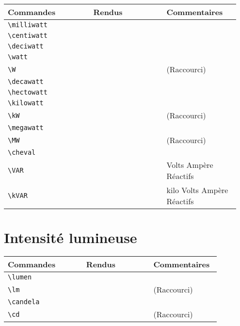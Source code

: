 \documentclass[a4paper,12pt]{article}
\newcommand{\rac}{({\color{red}Raccourci})}
\begin{document}
	\noindent
	\begin{tabular}{|p{0.35\linewidth}|p{0.3\linewidth}|p{0.3\linewidth}|}
		\hline
 			\textbf{Commandes}&\textbf{Rendus}&\textbf{Commentaires}
 		\\\hline\hline
			\verb!\milliwatt!	& 	\milliwatt	&	\\
		\hline
			\verb!\centiwatt!	& 	\centiwatt	&	\\
		\hline
			\verb!\deciwatt!	& 	\deciwatt	&	\\
		\hline
			\verb!\watt!		& 	\watt		&	\\
		\hline
			\verb!\W!		& 	\W		&	\rac\\
		\hline
			\verb!\decawatt!	& 	\decawatt	&	\\
		\hline
			\verb!\hectowatt!	& 	\hectowatt	&	\\
		\hline
			\verb!\kilowatt!	& 	\kilowatt	&	\\
		\hline
			\verb!\kW!		& 	\kW		&	\rac\\
		\hline
			\verb!\megawatt!	& 	\megawatt	&	\\
		\hline
			\verb!\MW!		& 	\MW		&	\rac\\
		\hline
			\verb!\cheval!		& 	\cheval		&	\\
		\hline
			\verb!\VAR!		& 	\VAR		&	Volts Ampère Réactifs\\
		\hline
			\verb!\kVAR!		& 	\kVAR		&	kilo Volts Ampère Réactifs\\
		\hline
	\end{tabular}
	
	
	\section{Intensité lumineuse}

	\noindent
	\begin{tabular}{|p{0.35\linewidth}|p{0.3\linewidth}|p{0.3\linewidth}|}
		\hline
 			\textbf{Commandes}&\textbf{Rendus}&\textbf{Commentaires}
 		\\\hline\hline
			\verb!\lumen!	& 	\lumen	&	\\
		\hline
			\verb!\lm!	& 	\lm	&	\rac\\
		\hline
			\verb!\candela!	& 	\candela	&	\\
		\hline
			\verb!\cd!	& 	\cd		&	\rac\\
		\hline
	\end{tabular}
	
\end{document}
